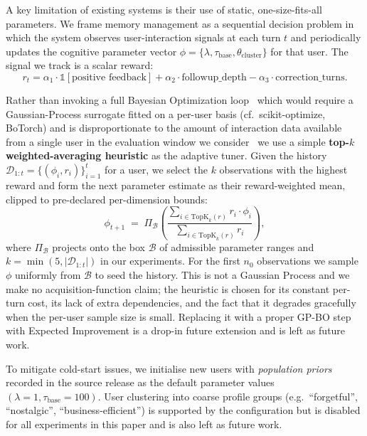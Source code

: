 A key limitation of existing systems is their use of static, one-size-fits-all parameters. We frame memory management as a sequential decision problem in which the system observes user-interaction signals at each turn $t$ and periodically updates the cognitive parameter vector $\phi = \{\lambda, \tau_{\text{base}}, \theta_{\text{cluster}}\}$ for that user. The signal we track is a scalar reward:
\begin{equation}
    r_t = \alpha_1 \cdot \mathbb{1}[\text{positive feedback}] + \alpha_2 \cdot \text{followup\_depth} - \alpha_3 \cdot \text{correction\_turns}.
\end{equation}

Rather than invoking a full Bayesian Optimization loop \textemdash\ which would require a Gaussian-Process surrogate fitted on a per-user basis (cf.\ scikit-optimize, BoTorch) and is disproportionate to the amount of interaction data available from a single user in the evaluation window we consider \textemdash\ we use a simple \textbf{top-$k$ weighted-averaging heuristic} as the adaptive tuner. Given the history $\mathcal{D}_{1:t} = \{(\phi_i, r_i)\}_{i=1}^{t}$ for a user, we select the $k$ observations with the highest reward and form the next parameter estimate as their reward-weighted mean, clipped to pre-declared per-dimension bounds:
\begin{equation}
    \phi_{t+1} \;=\; \Pi_{\mathcal{B}}\!\left(\frac{\sum_{i \in \mathrm{TopK}_k(r)} r_i \cdot \phi_i}{\sum_{i \in \mathrm{TopK}_k(r)} r_i}\right),
\end{equation}
where $\Pi_{\mathcal{B}}$ projects onto the box $\mathcal{B}$ of admissible parameter ranges and $k = \min(5, |\mathcal{D}_{1:t}|)$ in our experiments. For the first $n_0$ observations we sample $\phi$ uniformly from $\mathcal{B}$ to seed the history. This is not a Gaussian Process and we make no acquisition-function claim; the heuristic is chosen for its constant per-turn cost, its lack of extra dependencies, and the fact that it degrades gracefully when the per-user sample size is small. Replacing it with a proper GP-BO step with Expected Improvement is a drop-in future extension and is left as future work.

To mitigate cold-start issues, we initialise new users with \textit{population priors} recorded in the source release as the default parameter values $(\lambda = 1, \tau_{\text{base}} = 100)$. User clustering into coarse profile groups (e.g.\ ``forgetful'', ``nostalgic'', ``business-efficient'') is supported by the configuration but is disabled for all experiments in this paper and is also left as future work.

